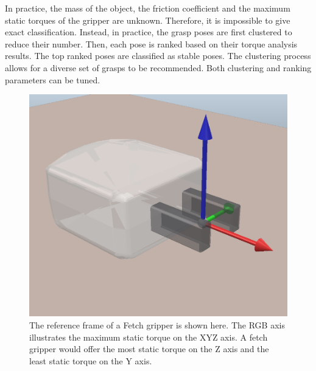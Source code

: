 \documentclass[12pt]{ucsddissertation}
\begin{document}
In practice, the mass of the object, the friction coefficient and the maximum static torques of the gripper are unknown. Therefore, it is impossible to give exact classification. Instead, in practice, the grasp poses are first clustered to reduce their number. Then, each pose is ranked based on their torque analysis results. The top ranked poses are classified as stable poses. The clustering process allows for a diverse set of grasps to be recommended. Both clustering and ranking parameters can be tuned.


\begin{figure}
	\centering
	\includegraphics[width=0.5\linewidth]{figures/axis.png}
	\caption[Frame and torque resistance of a Fetch gripper]{The reference frame of a Fetch gripper is shown here. The RGB axis illustrates the maximum static torque on the XYZ axis. A fetch gripper would offer the most static torque on the Z axis and the least static torque on the Y axis.}
	\label{fig:torqueFrame}
\end{figure}
\end{document}
